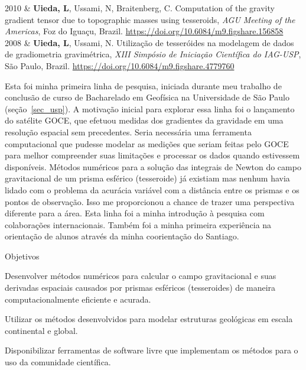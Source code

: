 \documentclass[10pt,a4paper,oneside]{book}
\newcommand{\Me}{\textbf{Uieda, L}}
\newcommand{\Carla}{Braitenberg, C}
\newcommand{\Naomi}{Ussami, N}
\newcommand{\DOI}[1]{\url{https://doi.org/#1}}
\begin{document}
\begin{subsummarybox}[frametitle=\faComment{}\quad Outras apresentações]
  \begin{paperlist}
    2010 & \Me, \Naomi, \Carla.
      Computation of the gravity gradient tensor due to topographic masses
      using tesseroids,
      \emph{AGU Meeting of the Americas},
      Foz do Iguaçu, Brazil.
      \DOI{10.6084/m9.figshare.156858}
      \\
    2008 & \Me, \Naomi.
      Utilização de tesseróides na modelagem de dados de gradiometria
      gravimétrica,
      \emph{XIII Simpósio de Iniciação Científica do IAG-USP},
      São Paulo, Brazil.
      \DOI{10.6084/m9.figshare.4779760}
  \end{paperlist}
\end{subsummarybox}

Esta foi minha primeira linha de pesquisa, iniciada durante meu trabalho de
conclusão de curso de Bacharelado em Geofísica na Universidade de São Paulo
(seção~\ref{sec_usp}).
A motivação inicial para explorar essa linha foi o lançamento do satélite
GOCE, que efetuou medidas dos gradientes da gravidade em uma resolução espacial
sem precedentes.
Seria necessária uma ferramenta computacional que pudesse modelar as medições
que seriam feitas pelo GOCE para melhor compreender suas limitações e processar
os dados quando estivessem disponíveis.
Métodos numéricos para a solução das integrais de Newton do campo gravitacional
de um prisma esférico (tesseroide) já existiam
\citep{Heck2006,Asgharzadeh2007,WildPfeiffer2008} mas nenhum havia lidado com o
problema da acurácia variável com a distância entre os prismas e os pontos de
observação.
Isso me proporcionou a chance de trazer uma perspectiva diferente para a área.
Esta linha foi a minha introdução à pesquisa com colaborações internacionais.
Também foi a minha primeira experiência na orientação de alunos através da
minha coorientação do Santiago.

\begin{fancyenum}{\faBullseye}{Objetivos}
  \item Desenvolver métodos numéricos para calcular o campo gravitacional e
    suas derivadas espaciais causados por prismas esféricos (tesseroides) de
    maneira computacionalmente eficiente e acurada.
  \item Utilizar os métodos desenvolvidos para modelar estruturas geológicas em
    escala continental e global.
  \item Disponibilizar ferramentas de software livre que implementam os métodos
    para o uso da comunidade científica.
\end{fancyenum}
\end{document}

